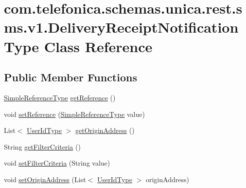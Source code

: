 \hypertarget{classcom_1_1telefonica_1_1schemas_1_1unica_1_1rest_1_1sms_1_1v1_1_1DeliveryReceiptNotificationType}{
\section{com.telefonica.schemas.unica.rest.sms.v1.DeliveryReceiptNotificationType Class Reference}
\label{classcom_1_1telefonica_1_1schemas_1_1unica_1_1rest_1_1sms_1_1v1_1_1DeliveryReceiptNotificationType}
}
\subsection*{Public Member Functions}
\begin{DoxyCompactItemize}
\item 
\hyperlink{classcom_1_1telefonica_1_1schemas_1_1unica_1_1rest_1_1common_1_1v1_1_1SimpleReferenceType}{SimpleReferenceType} \hyperlink{classcom_1_1telefonica_1_1schemas_1_1unica_1_1rest_1_1sms_1_1v1_1_1DeliveryReceiptNotificationType_a4c21bf3fd6a806b55d3122d93efc6df4}{getReference} ()
\item 
void \hyperlink{classcom_1_1telefonica_1_1schemas_1_1unica_1_1rest_1_1sms_1_1v1_1_1DeliveryReceiptNotificationType_a9fc0396af5fa485ae372c31f151b932a}{setReference} (\hyperlink{classcom_1_1telefonica_1_1schemas_1_1unica_1_1rest_1_1common_1_1v1_1_1SimpleReferenceType}{SimpleReferenceType} value)
\item 
List$<$ \hyperlink{classcom_1_1telefonica_1_1schemas_1_1unica_1_1rest_1_1common_1_1v1_1_1UserIdType}{UserIdType} $>$ \hyperlink{classcom_1_1telefonica_1_1schemas_1_1unica_1_1rest_1_1sms_1_1v1_1_1DeliveryReceiptNotificationType_aec1d4f50dc6ada74da10631b18504460}{getOriginAddress} ()
\item 
String \hyperlink{classcom_1_1telefonica_1_1schemas_1_1unica_1_1rest_1_1sms_1_1v1_1_1DeliveryReceiptNotificationType_a7d51c98e0c93d868b70c0b5c6e70611c}{getFilterCriteria} ()
\item 
void \hyperlink{classcom_1_1telefonica_1_1schemas_1_1unica_1_1rest_1_1sms_1_1v1_1_1DeliveryReceiptNotificationType_ac5d958536fa325c8e4059ab12826b8a6}{setFilterCriteria} (String value)
\item 
void \hyperlink{classcom_1_1telefonica_1_1schemas_1_1unica_1_1rest_1_1sms_1_1v1_1_1DeliveryReceiptNotificationType_a82a4ddaf6f8745c743b32006047725c4}{setOriginAddress} (List$<$ \hyperlink{classcom_1_1telefonica_1_1schemas_1_1unica_1_1rest_1_1common_1_1v1_1_1UserIdType}{UserIdType} $>$ originAddress)
\end{DoxyCompactItemize}
